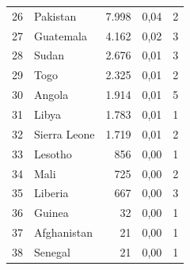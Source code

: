 \documentclass[a4paper,11pt]{article}
\begin{document}
{\begin{longtable}{@{}r l r r r@{}}
26 & Pakistan & 7.998 & 0,04 & 2 \\
27 & Guatemala & 4.162 & 0,02 & 3 \\
28 & Sudan & 2.676 & 0,01 & 3 \\
29 & Togo & 2.325 & 0,01 & 2 \\
30 & Angola & 1.914 & 0,01 & 5 \\
31 & Libya & 1.783 & 0,01 & 1 \\
32 & Sierra Leone & 1.719 & 0,01 & 2 \\
33 & Lesotho & 856 & 0,00 & 1 \\
34 & Mali & 725 & 0,00 & 2 \\
35 & Liberia & 667 & 0,00 & 3 \\
36 & Guinea & 32 & 0,00 & 1 \\
37 & Afghanistan & 21 & 0,00 & 1 \\
38 & Senegal & 21 & 0,00 & 1 \\
\end{longtable}
}



\end{document}
